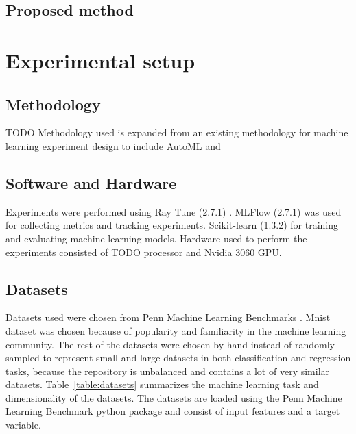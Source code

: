 \subsection{Proposed method}




\section{Experimental setup}

\subsection{Methodology}
TODO Methodology used is expanded from an existing methodology for machine learning experiment design \parencite{fernandez-lozanoMethodologyDesignExperiments2016} to include AutoML and

\subsection{Software and Hardware}

Experiments were performed using Ray Tune (2.7.1) \parencite{liawTuneResearchPlatform2018}. MLFlow (2.7.1) \parencite{chenDevelopmentsMLflowSystem2020} was used for collecting metrics and tracking experiments. Scikit-learn (1.3.2) \parencite{pedregosaScikitlearnMachineLearning2011} for training and evaluating machine learning models. Hardware used to perform the experiments consisted of TODO processor and Nvidia 3060 GPU.

\subsection{Datasets}

Datasets used were chosen from Penn Machine Learning Benchmarks \parencite{olsonPMLBLargeBenchmark2017}. Mnist dataset was chosen because of popularity and familiarity in the machine learning community. The rest of the datasets were chosen by hand instead of randomly sampled to represent small and large datasets in both classification and regression tasks, because the repository is unbalanced and contains a lot of very similar datasets. Table~\ref{table:datasets} summarizes the machine learning task and dimensionality of the datasets. The datasets are loaded using the Penn Machine Learning Benchmark \parencite{olsonPMLBLargeBenchmark2017} python package and consist of input features and a target variable.

